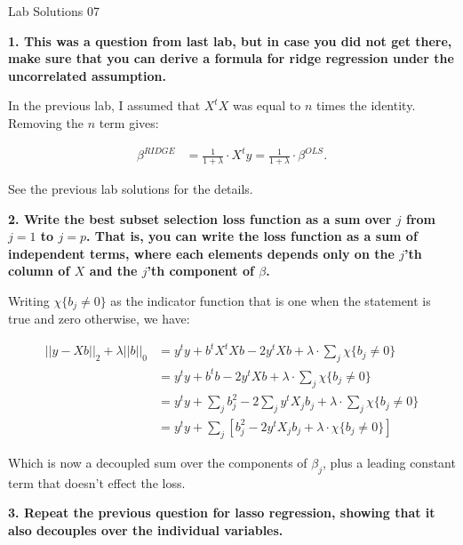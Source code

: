 \documentclass[12pt,hidelinks]{article}
\numberwithin{equation}{section}
\begin{document}
{\LARGE Lab Solutions 07}

\vspace*{12pt}

\textbf{1. This was a question from last lab, but in case you did not get there,
make sure that you can derive a formula for ridge regression under the uncorrelated
assumption.}

\vspace*{12pt}

In the previous lab, I assumed that $X^t X$ was equal to $n$ times the identity.
Removing the $n$ term gives:

\begin{align*}
\beta^{RIDGE} &= \frac{1}{1 + \lambda} \cdot X^t y = \frac{1}{1 + \lambda} \cdot \beta^{OLS}.
\end{align*}

See the previous lab solutions for the details.

\vspace*{12pt}

\textbf{2. Write the best subset selection loss function as a sum over $j$ from $j=1$
to $j=p$. That is, you can write the loss function as a sum of independent terms,
where each elements depends only on the $j$'th column of $X$ and the $j$'th component
of $\beta$.}

\vspace*{12pt}

Writing $\chi\{ b_j \neq 0 \}$ as the indicator function that is one when the
statement is true and zero otherwise, we have:

\begin{align*}
|| y - X b ||_2 + \lambda || b ||_0 &=
y^t y + b^t X^t X b - 2 y^t X b + \lambda \cdot \sum_j \chi\{ b_j \neq 0 \} \\
&= y^t y + b^t b - 2 y^t X b + \lambda \cdot \sum_j \chi\{ b_j \neq 0 \} \\
&= y^t y + \sum_j b_j^2 - 2 \sum_j y^t X_j b_j + \lambda \cdot \sum_j \chi\{ b_j \neq 0 \} \\
&= y^t y + \sum_j \left[ b_j^2 - 2  y^t X_j b_j + \lambda \cdot \chi\{ b_j \neq 0 \} \right]
\end{align*}

Which is now a decoupled sum over the components of $\beta_j$, plus a leading
constant term that doesn't effect the loss.

\vspace*{12pt}

\textbf{3. Repeat the previous question for lasso regression, showing that it also
decouples over the individual variables.}
\end{document}
